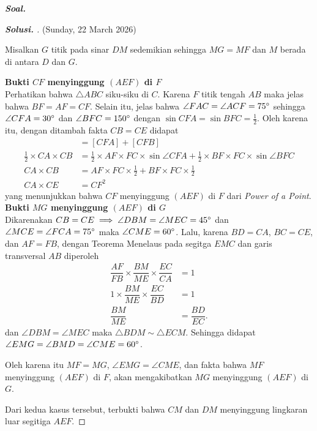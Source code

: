 \textbf{\textit{Soal.}} 
\begin{proof}[\textbf{Solusi. }] (Sunday, 22 March 2026) 
    

    Misalkan $G$ titik pada sinar $DM$ sedemikian sehingga $MG = MF$ dan $M$ berada di antara $D$ dan $G$.

\textbf{Bukti $CF$ menyinggung $(AEF)$ di $F$}\\
Perhatikan bahwa $\triangle ABC$ siku-siku di $C$. Karena $F$ titik tengah $AB$ maka jelas bahwa $BF=AF=CF$. Selain itu, jelas bahwa $\angle FAC = \angle ACF = 75^\circ$ sehingga $\angle CFA = 30^\circ$ dan $\angle BFC = 150^\circ$ dengan $\sin CFA = \sin BFC = \frac{1}{2}$. Oleh karena itu, dengan ditambah fakta $CB = CE$ didapat
\begin{align*}
    [ABC] &= [CFA] + [CFB]\\
    \frac{1}{2} \times CA \times CB &= \frac{1}{2} \times AF \times FC \times \sin \angle CFA + \frac{1}{2} \times BF \times FC \times \sin \angle BFC\\
     CA \times CB &= AF \times FC \times \frac{1}{2} + BF \times FC \times \frac{1}{2} \\
     CA \times CE &= CF^2
\end{align*}
yang menunjukkan bahwa $CF$ menyinggung $(AEF)$ di $F$ dari \textit{Power of a Point}.\\
\newline
\textbf{Bukti $MG$ menyinggung $(AEF)$ di $G$}\\
Dikarenakan $CB = CE \implies \angle DBM = \angle MEC = 45^\circ$ dan $\angle MCE = \angle FCA = 75^\circ$ maka $\angle CME = 60^\circ$.
Lalu, karena $BD = CA$, $BC = CE$, dan $AF=FB$, dengan Teorema Menelaus pada segitga $EMC$ dan garis transversal $AB$ diperoleh
\begin{align*}
    \dfrac{AF}{FB} \times \dfrac{BM}{ME} \times \dfrac{EC}{CA} &= 1\\
    1 \times \dfrac{BM}{ME} \times \dfrac{EC}{BD} &= 1\\
    \dfrac{BM}{ME} &= \dfrac{BD}{EC}.
\end{align*}
dan $\angle DBM = \angle MEC$ maka $\triangle BDM \sim \triangle ECM$. Sehingga didapat $\angle EMG = \angle BMD = \angle CME = 60^\circ$. 

Oleh karena itu $MF = MG$, $\angle EMG = \angle CME$, dan fakta bahwa $MF$ menyinggung $(AEF)$ di $F$, akan mengakibatkan $MG$ menyinggung $(AEF)$ di $G$.

Dari kedua kasus tersebut, terbukti bahwa $CM$ dan $DM$ menyinggung lingkaran luar segitiga $AEF$.
\end{proof}